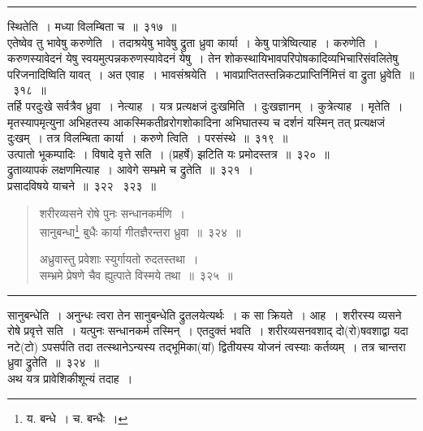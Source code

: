 \documentclass[11pt, openany]{book}
\begin{document}
\hrule

\vspace{2mm}
{\qtt स्थितेति}~। मध्या विलम्बिता च~॥~३१७~॥\\

{\qtt एतेष्वेव तु भावेषु करुणेति}~। तदाश्रयेषु {\qtt भावेषु द्रुता ध्रुवा} कार्या~। केषु पात्रेष्वित्याह~। {\qtt करुणेति}~। करुणस्यावेदनं येषु स्वयमुत्पन्नकरुणस्यावेदनं येषु~। तेन शोकस्थायिभावपरिपोषकादिव्यभिचारिसंवलितेषु परिजनादिष्विति यावत्~। अत एवाह~। {\qtt भावसंश्रयेति}~। भावप्राप्तितस्तन्निकटप्राप्तिर्निमित्तं वा {\qtt द्रुता} ध्रुवेति~॥~३१८~॥\\

तर्हि परदुःखे सर्वत्रैव ध्रुवा~। नेत्याह~। {\qtt यत्र प्रत्यक्षजं दुःखमिति}~। दुःखज्ञानम्~। कुत्रेत्याह~। मृतेति~। मृतस्यापमृत्युना अभिहतस्य आकस्मिकतीव्ररोगशोकादिना अभिघातस्य च दर्शनं यस्मिन् तत् प्रत्यक्षजं दुःखम्~। तत्र विलम्बिता कार्या~। करुणे त्विति~। परसंस्थे~॥~३१९~॥\\

उत्पातो भूकम्पादिः~। विषादे वृत्ते सति~। (प्रहर्षे) झटिति यः प्रमोदस्तत्र~॥~३२०~॥\\

द्रुताव्यापकं लक्षणमित्याह~। आवेगे सम्भ्रमे च द्रुतेति~॥~३२१~। \\

प्रसादविषये याचने~॥~३२२ \textendash\ ३२३~॥

\newpage

\begin{quote}
{\na शरीरव्यसने रोषे पुनः सन्धानकर्मणि~।\\
सानुबन्धा\renewcommand{\thefootnote}{1}\footnote{य. बन्धे~। च. बन्धैः~।} बुधैः कार्या गीतज्ञैरन्तरा ध्रुवा~॥~३२४~॥

अध्रुवास्तु प्रवेशाः स्युर्गायतो रुदतस्तथा~।\\
सम्भ्रमे प्रेषणे चैव ह्युत्पाते विस्मये तथा~॥~३२५~॥}
\end{quote}

\hrule

\vspace{2mm}
{\qtt सानुबन्धेति}~। अनुन्धः त्वरा तेन {\qtt सानुबन्धे}ति द्रुतलयेत्यर्थः~। क सा क्रियते~। आह~। शरीरस्य व्यसने रोषे प्रवृत्ते सति~। {\qtt यत्पुनः सन्धानकर्म} तस्मिन्~। एतदुक्तं भवति~। शरीरव्यसनवशाद् दो(रो)षवशाद्वा यदा नटे(टो) ऽपसर्पति तदा तत्स्थानेऽन्यस्य तद्भूमिका(यां) द्वितीयस्य योजनं त्वस्याः कर्तव्यम्~। तत्र {\qtt चान्तरा ध्रुवा} द्रुतेति~॥~३२४~॥\\

अथ यत्र प्रावेशिकीशून्यं तदाह~।
\end{document}
